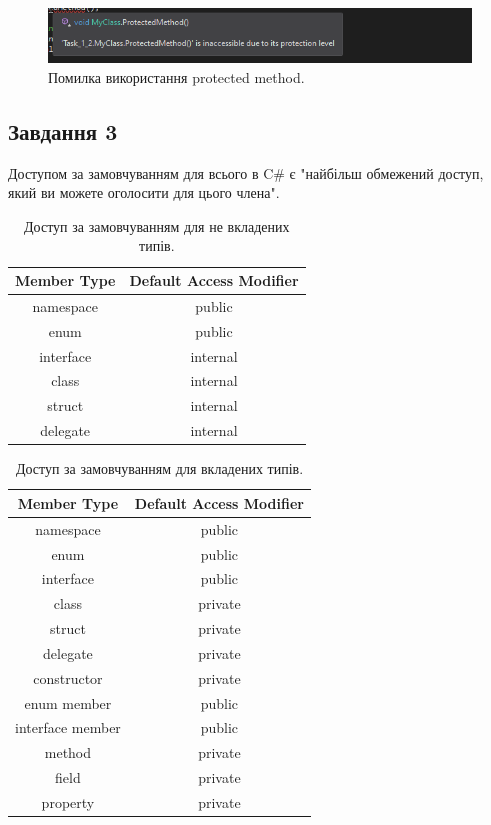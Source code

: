 \documentclass[oneside,14pt]{extarticle}
\begin{document}
\begin{normalsize}
	\begin{figure}[H]
		\centering
		\includegraphics[scale=0.7]{1_2_4}
		\caption{Помилка використання protected method.}
	\end{figure}

	\subsection*{Завдання 3}
	Доступом за замовчуванням для всього в C\# є "найбільш обмежений доступ, який ви можете оголосити для цього члена".
	
		\begin{table}[H]
		\centering
		\begin{tabular}{ |c|c| }
			\hline
			\textbf{Member Type} & \textbf{Default Access Modifier} \\ 
			\hline
			namespace & public \\ 
			\hline
			enum & public \\ 
			\hline
			interface & internal \\ 
			\hline
			class & internal \\ 
			\hline
			struct & internal \\ 
			\hline
			delegate & internal \\ 
			\hline
		\end{tabular}
		\caption{Доступ за замовчуванням для не вкладених типів.}
	\end{table}
	
	\begin{table}[H]
		\centering
		\begin{tabular}{ |c|c| }
			\hline
			\textbf{Member Type} & \textbf{Default Access Modifier} \\ 
			\hline
			namespace & public \\
			\hline
			enum & public \\
			\hline
			interface & public \\
			\hline
			class & private \\
			\hline
			struct & private \\
			\hline
			delegate & private \\
			\hline
			constructor & private \\ 
			\hline
			enum member & public\\ 
			\hline
			interface member & public \\ 
			\hline
			method & private \\ 
			\hline
			field & private \\  
			\hline
			property & private \\  
			\hline
		\end{tabular}
		\caption{Доступ за замовчуванням для вкладених типів.}
	\end{table}
		

\end{normalsize}
\end{document}
